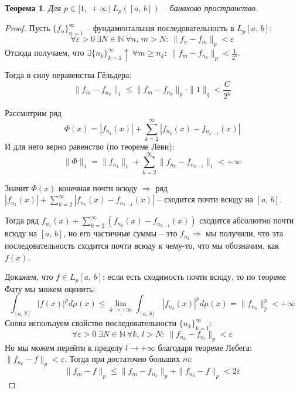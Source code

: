 \documentclass[a4paper,12pt]{article}
\renewcommand{\leq}{\ensuremath{\leqslant}}
\renewcommand{\geq}{\ensuremath{\geqslant}}
\theoremstyle{plain}
\newtheorem{theorem}{Теорема}[section]
\theoremstyle{definition}
\theoremstyle{remark}
\begin{document}
\begin{theorem}
	Для $p \in [1,\,+\infty) \: L_p([a,\,b])$ -- банахово пространство.
\end{theorem}

\begin{proof}
	Пусть $\{f_n\}_{n = 1}^\infty$ -- фундаментальная последовательность в $L_p[a,\,b]$:
	\[\forall \varepsilon > 0 \: \exists N \in \mathbb{N} \: \forall n,\,m > N :\: \|f_n - f_m\|_p < \varepsilon\]
	Отсюда получаем, что $\exists \{n_k\}_{k = 1}^\infty \uparrow \: \forall m \geq n_k :\: \|f_m - f_{n_k}\|_p < \frac{1}{2^k}$.
	
	Тогда в силу неравенства Гёльдера:
	\[\|f_m - f_{n_k}\|_1 \leq \|f_m - f_{n_k}\|_p \cdot \|1\|_q < \frac{C}{2^k}\]

	Рассмотрим ряд
	\[\Phi(x) = |f_{n_1}(x)| + \sum_{k = 2}^\infty |f_{n_k}(x) - f_{n_{k-1}}(x)|\]
	И для него верно равенство (по теореме Леви):
	\[\|\Phi\|_1 = \|f_{n_1}\|_1 + \sum_{k = 2}^\infty \|f_{n_k} - f_{n_{k-1}}\|_1 < +\infty\]

	Значит $\Phi(x)$ конечная почти всюду $\Rightarrow$ ряд $|f_{n_1}(x)| + \sum_{k = 2}^\infty |f_{n_k}(x) - f_{n_{k-1}}(x)|$ -- сходится почти всюду на $[a,\,b]$.

	Тогда ряд $f_{n_1}(x) + \sum_{k = 2}^\infty (f_{n_k}(x) - f_{n_{k-1}}(x))$ сходится абсолютно почти всюду на $[a,\,b]$, но его частичные суммы -- это $f_{n_k} \Rightarrow$ мы получили, что эта последовательность сходится почти всюду к чему-то, что мы обозначим, как $f(x)$.

	Докажем, что $f \in L_p[a,\,b]$: если есть сходимость почти всюду, то по теореме Фату мы можем оценить:
	\[\int_{[a,\,b]}|f(x)|^pd\mu(x) \leq \underline{\lim\limits_{k \to +\infty}} \int_{[a,\,b]}|f_{n_k}(x)|^pd\mu(x) = \|f_{n_k}\|_p^p < +\infty\]
	Снова используем свойство последовательности $\{n_k\}_{k = 1}^\infty$:
	\[\forall \varepsilon > 0 \: \exists N \in \mathbb{N} \: \forall k,\,l > N :\: \|f_{n_k} - f_{n_l}\|_p < \varepsilon\]
	Но мы можем перейти к пределу $l \to +\infty$ благодаря теореме Лебега: $\|f_{n_k} - f\|_p < \varepsilon$. Тогда при достаточно больших $m$:
	\[\|f_m - f\|_p \leq \|f_m - f_{n_k}\|_p + \|f_{n_k} - f\|_p < 2\varepsilon\]
\end{proof}
\end{document}
